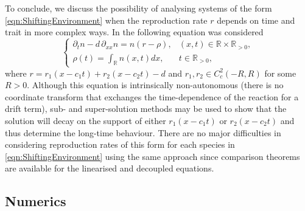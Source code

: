 \documentclass{article}
\begin{document}
To conclude, we discuss the possibility of analysing systems of the form \eqref{eqn:ShiftingEnvironment} when the reproduction rate $r$ depends on time and trait in more complex ways. In \cite{adaptivedynamicsdivergingfitness} the following equation was considered
\begin{equation}
    \begin{cases}
        \partial_tn-d\,\partial_{xx}n=n(r-\rho),&(x,t)\in\mathbb{R}\times\mathbb{R}_{>0},\\
        \rho(t)=\int_{\mathbb{R}}n(x,t)dx,&t\in\mathbb{R}_{>0},
    \end{cases}
\end{equation}
where $r=r_1(x-c_1t)+r_2(x-c_2t)-d$ and $r_1,r_2\in{}C^2_c(-R,R)$ for some $R>0$. Although this equation is intrinsically non-autonomous (there is no coordinate transform that exchanges the time-dependence of the reaction for a drift term), sub- and super-solution methods may be used to show that the solution will decay on the support of either $r_1(x-c_1t)$ or $r_2(x-c_2t)$ and thus determine the long-time behaviour. There are no major difficulties in considering reproduction rates of this form for each species in \eqref{eqn:ShiftingEnvironment} using the same approach since  comparison theorems are available for the linearised and decoupled equations.


\subsection{Numerics}
\end{document}
